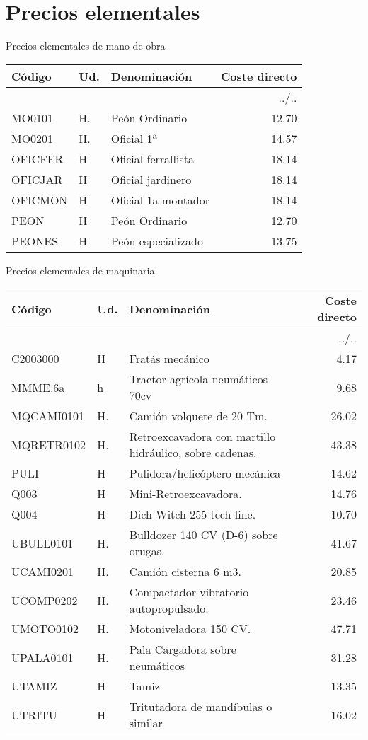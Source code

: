 \documentclass{book}%
\begin{document}
%
\normalsize%
\part{Precios elementales}%
\label{sec:Precioselementales}%
\begin{center}
%
\Large%
 Precios elementales de mano de obra %
\normalsize%
\end{center}
%
\small%
\begin{longtable}{|l|l|p{4cm}|r|}%
\hline%
Código&Ud.&Denominación&Coste directo\\%
\hline%
\endhead%
\hline%
\multicolumn{4}{|r|}{../..}\\%
\hline%
\endfoot%
\hline%
\endlastfoot%
MO0101&H.&Peón Ordinario&12.70\\%
MO0201&H.&Oficial 1ª&14.57\\%
OFICFER&H&Oficial ferrallista&18.14\\%
OFICJAR&H&Oficial jardinero&18.14\\%
OFICMON&H&Oficial 1a montador&18.14\\%
PEON&H&Peón Ordinario&12.70\\%
PEONES&H&Peón especializado&13.75\\%
\end{longtable}%
\normalsize%
\begin{center}
%
\Large%
 Precios elementales de maquinaria %
\normalsize%
\end{center}
%
\small%
\begin{longtable}{|l|l|p{4cm}|r|}%
\hline%
Código&Ud.&Denominación&Coste directo\\%
\hline%
\endhead%
\hline%
\multicolumn{4}{|r|}{../..}\\%
\hline%
\endfoot%
\hline%
\endlastfoot%
C2003000&H&Fratás mecánico&4.17\\%
MMME.6a&h&Tractor agrícola neumáticos 70cv&9.68\\%
MQCAMI0101&H.&Camión volquete de 20 Tm.&26.02\\%
MQRETR0102&H.&Retroexcavadora con martillo hidráulico, sobre cadenas.&43.38\\%
PULI&H&Pulidora/helicóptero mecánica&14.62\\%
Q003&H&Mini{-}Retroexcavadora.&14.76\\%
Q004&H&Dich{-}Witch 255 tech{-}line.&10.70\\%
UBULL0101&H.&Bulldozer 140 CV (D{-}6) sobre orugas.&41.67\\%
UCAMI0201&H.&Camión cisterna 6 m3.&20.85\\%
UCOMP0202&H.&Compactador vibratorio autopropulsado.&23.46\\%
UMOTO0102&H.&Motoniveladora 150 CV.&47.71\\%
UPALA0101&H.&Pala Cargadora sobre neumáticos&31.28\\%
UTAMIZ&H&Tamiz&13.35\\%
UTRITU&H&Tritutadora de mandíbulas o similar&16.02\\%
\end{longtable}%
\end{document}
